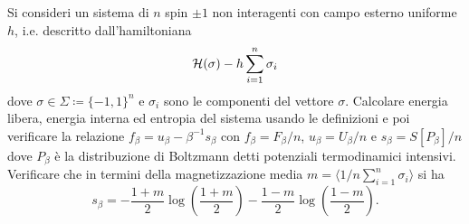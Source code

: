 \begin{exercise}
    Si consideri un sistema di $ n $ spin $ \pm 1 $ non interagenti con campo esterno uniforme $ h $, i.e. descritto dall'hamiltoniana
    \[ \mathcal{H}(\sigma) -h \sum_{i=1}^{n} \sigma_i\]
    dove $ \sigma \in \Sigma \coloneqq \{-1, 1\}^n $ e $ \sigma_i $ sono le componenti del vettore $ \sigma $. Calcolare energia libera, energia interna ed entropia del sistema usando le definizioni e poi verificare la relazione $ f_\beta = u_\beta - \beta^{-1} s_\beta $ con $ f_\beta = F_\beta/n $, $ u_\beta = U_\beta/n $ e $ s_\beta = S[P_\beta]/n $ dove $ P_\beta $ è la distribuzione di Boltzmann detti potenziali termodinamici intensivi. Verificare che in termini della magnetizzazione media $ m = \langle 1/n \sum_{i=1}^{n} \sigma_i \rangle $ si ha
    \[ s_\beta = -\frac{1+m}{2} \log{\left(\frac{1+m}{2}\right)} - \frac{1-m}{2} \log{\left(\frac{1-m}{2}\right)}. \]
\end{exercise}
